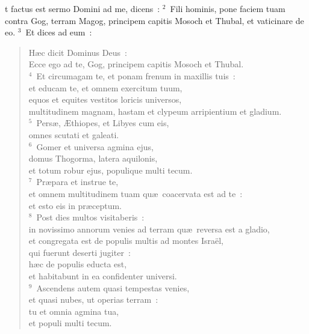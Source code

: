 \bchapter
{}t factus est sermo Domini ad me, dicens~:
${}^{2}$~Fili hominis, pone faciem tuam contra Gog, terram Magog, principem capitis Mosoch et Thubal, et vaticinare de eo.
${}^{3}$~Et dices ad eum~: \begin{flushleft}\begin{verse}H\ae c dicit Dominus Deus~:\\ Ecce ego ad te, Gog, principem capitis Mosoch et Thubal.\\
${}^{4}$~Et circumagam te, et ponam frenum in maxillis tuis~:\\ et educam te, et omnem exercitum tuum,\\ equos et equites vestitos loricis universos,\\ multitudinem magnam, hastam et clypeum arripientium et gladium.\\
${}^{5}$~Pers\ae , \AE thiopes, et Libyes cum eis,\\ omnes scutati et galeati.\\
${}^{6}$~Gomer et universa agmina ejus,\\ domus Thogorma, latera aquilonis,\\ et totum robur ejus, populique multi tecum.\\
${}^{7}$~Pr\ae para et instrue te,\\ et omnem multitudinem tuam qu\ae\ coacervata est ad te~:\\ et esto eis in pr\ae ceptum.\\
${}^{8}$~Post dies multos visitaberis~:\\ in novissimo annorum venies ad terram qu\ae\ reversa est a gladio,\\ et congregata est de populis multis ad montes Isra\"el,\\ qui fuerunt deserti jugiter~:\\ h\ae c de populis educta est,\\ et habitabunt in ea confidenter universi.\\
${}^{9}$~Ascendens autem quasi tempestas venies,\\ et quasi nubes, ut operias terram~:\\ tu et omnia agmina tua,\\ et populi multi tecum.\end{verse}\end{flushleft}


